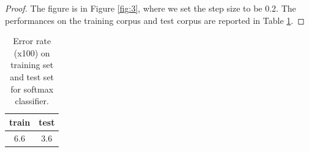 \documentclass[11pt]{article}
\newcommand{\1}{\mathbf{1}}
\begin{document}
\begin{proof}
  The figure is in Figure \ref{fig:3}, where we set the step size to be 0.2. The performances on the training corpus and test corpus are reported in Table \ref{tb:3}.
\end{proof}
 \begin{table}[htbp]
    \begin{center}
      \begin{tabular}{c|c}
      \hline
      {\bf train} & {\bf test} \\
      \hline
      6.6 & 3.6\\
      \hline
      \end{tabular}
      \caption{Error rate (x100) on training set and test set for softmax classifier. \label{tb:3}}
    \end{center}
    \end{table}
\end{document}
